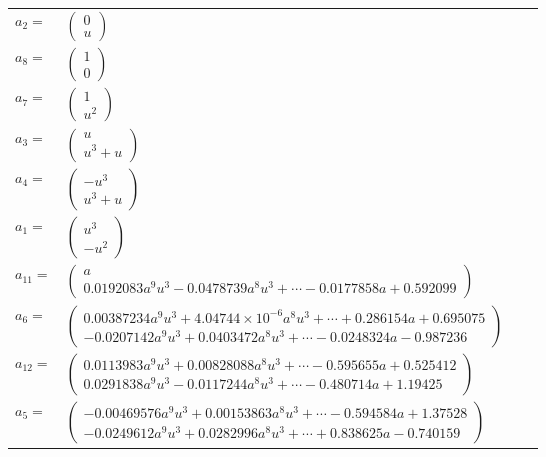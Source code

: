 \documentclass[1p]{elsarticle_modified}
\theoremstyle{definition}
\begin{document}
\begin{tabular}{m{7pt} m{180pt} m{7pt} m{180pt} }
\flushright $a_{2}=$&$\begin{pmatrix}0\\u\end{pmatrix}$ \\
\flushright $a_{8}=$&$\begin{pmatrix}1\\0\end{pmatrix}$ \\
\flushright $a_{7}=$&$\begin{pmatrix}1\\u^2\end{pmatrix}$ \\
\flushright $a_{3}=$&$\begin{pmatrix}u\\u^3+u\end{pmatrix}$ \\
\flushright $a_{4}=$&$\begin{pmatrix}- u^3\\u^3+u\end{pmatrix}$ \\
\flushright $a_{1}=$&$\begin{pmatrix}u^3\\- u^2\end{pmatrix}$ \\
\flushright $a_{11}=$&$\begin{pmatrix}a\\0.0192083 a^{9} u^{3}-0.0478739 a^{8} u^{3}+\cdots-0.0177858 a+0.592099\end{pmatrix}$ \\
\flushright $a_{6}=$&$\begin{pmatrix}0.00387234 a^{9} u^{3}+4.04744\times10^{-6} a^{8} u^{3}+\cdots+0.286154 a+0.695075\\-0.0207142 a^{9} u^{3}+0.0403472 a^{8} u^{3}+\cdots-0.0248324 a-0.987236\end{pmatrix}$ \\
\flushright $a_{12}=$&$\begin{pmatrix}0.0113983 a^{9} u^{3}+0.00828088 a^{8} u^{3}+\cdots-0.595655 a+0.525412\\0.0291838 a^{9} u^{3}-0.0117244 a^{8} u^{3}+\cdots-0.480714 a+1.19425\end{pmatrix}$ \\
\flushright $a_{5}=$&$\begin{pmatrix}-0.00469576 a^{9} u^{3}+0.00153863 a^{8} u^{3}+\cdots-0.594584 a+1.37528\\-0.0249612 a^{9} u^{3}+0.0282996 a^{8} u^{3}+\cdots+0.838625 a-0.740159\end{pmatrix}$ \\

\end{tabular}
\end{document}
